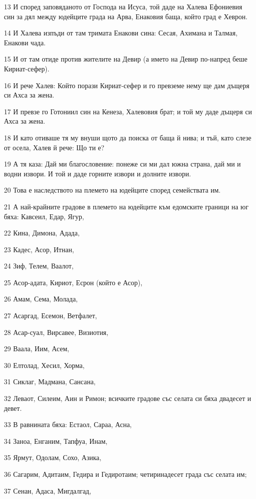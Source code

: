 \par 13 И според заповяданото от Господа на Исуса, той даде на Халева Ефониевия син за дял между юдейците града на Арва, Енаковия баща, който град е Хеврон.
\par 14 И Халева изпъди от там тримата Енакови сина: Сесая, Ахимана и Талмая, Енакови чада.
\par 15 И от там отиде против жителите на Девир (а името на Девир по-напред беше Кириат-сефер).
\par 16 И рече Халев: Който порази Кириат-сефер и го превземе нему ще дам дъщеря си Ахса за жена.
\par 17 И превзе го Готониил син на Кенеза, Халевовия брат; и той му даде дъщеря си Ахса за жена.
\par 18 И като отиваше тя му внуши щото да поиска от баща й нива; и тъй, като слезе от осела, Халев й рече: Що ти е?
\par 19 А тя каза: Дай ми благословение: понеже си ми дал южна страна, дай ми и водни извори. И той и даде горните извори и долните извори.
\par 20 Това е наследството на племето на юдейците според семействата им.
\par 21 А най-крайните градове в племето на юдейците към едомските граници на юг бяха: Кавсеил, Едар, Ягур,
\par 22 Кина, Димона, Адада,
\par 23 Кадес, Асор, Итнан,
\par 24 Зиф, Телем, Ваалот,
\par 25 Асор-адата, Кириот, Есрон (който е Асор),
\par 26 Амам, Сема, Молада,
\par 27 Асаргад, Есемон, Ветфалет,
\par 28 Асар-суал, Вирсавее, Визиотия,
\par 29 Ваала, Иим, Асем,
\par 30 Елтолад, Хесил, Хорма,
\par 31 Сиклаг, Мадмана, Сансана,
\par 32 Леваот, Силеим, Аин и Римон; всичките градове със селата си бяха двадесет и девет.
\par 33 В равнината бяха: Естаол, Сараа, Асна,
\par 34 Заноа, Енганим, Тапфуа, Инам,
\par 35 Ярмут, Одолам, Сохо, Азика,
\par 36 Сагарим, Адитаим, Гедира и Гедиротаим; четиринадесет града със селата им;
\par 37 Сенан, Адаса, Мигдалгад,
